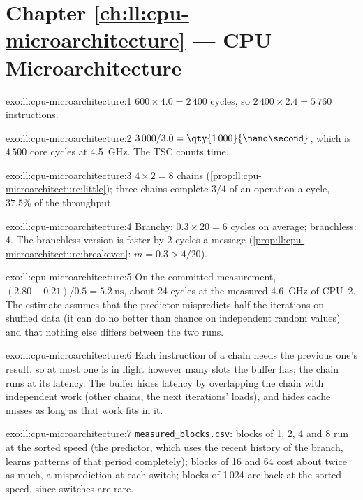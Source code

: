 \section*{Chapter \ref{ch:ll:cpu-microarchitecture} --- CPU Microarchitecture}

\begin{solution}{exo:ll:cpu-microarchitecture:1}
$600 \times 4.0 = 2\,400$ cycles, so $2\,400 \times 2.4 = 5\,760$ instructions.
\end{solution}

\begin{solution}{exo:ll:cpu-microarchitecture:2}
$3\,000 / 3.0 = \qty{1\,000}{\nano\second}$, which is $4\,500$ core cycles at 4.5~GHz. The TSC counts time.
\end{solution}

\begin{solution}{exo:ll:cpu-microarchitecture:3}
$4 \times 2 = 8$ chains (\cref{prop:ll:cpu-microarchitecture:little}); three chains complete $3/4$ of an operation a
cycle, $37.5\%$ of the throughput.
\end{solution}

\begin{solution}{exo:ll:cpu-microarchitecture:4}
Branchy: $0.3 \times 20 = 6$ cycles on average; branchless: 4. The branchless version is faster by 2 cycles a message
(\cref{prop:ll:cpu-microarchitecture:breakeven}: $m = 0.3 > 4/20$).
\end{solution}

\begin{solution}{exo:ll:cpu-microarchitecture:5}
On the committed measurement, $(2.80 - 0.21)/0.5 = \qty{5.2}{\nano\second}$, about 24 cycles at the measured
4.6~GHz of CPU~2. The estimate assumes that the predictor mispredicts half the iterations on shuffled data (it can do
no better than chance on independent random values) and that nothing else differs between the two runs.
\end{solution}

\begin{solution}{exo:ll:cpu-microarchitecture:6}
Each instruction of a chain needs the previous one's result, so at most one is in flight however many slots the buffer
has; the chain runs at its latency. The buffer hides latency by overlapping the chain with independent work (other
chains, the next iterations' loads), and hides cache misses as long as that work fits in it.
\end{solution}

\begin{solution}{exo:ll:cpu-microarchitecture:7}
\texttt{measured\_blocks.csv}: blocks of 1, 2, 4 and 8 run at the sorted speed (the predictor, which uses the recent
history of the branch, learns patterns of that period completely); blocks of 16 and 64 cost about twice as much, a
misprediction at each switch; blocks of 1\,024 are back at the sorted speed, since switches are rare.
\end{solution}

